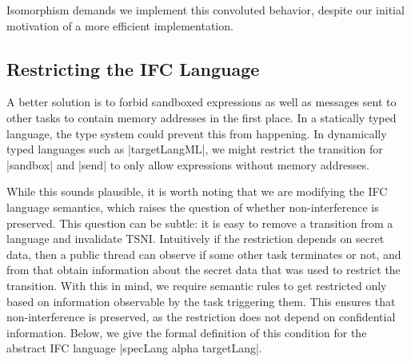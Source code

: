 Isomorphism demands we implement this convoluted behavior,
despite our initial motivation of a more efficient implementation.



\subsection{Restricting the IFC Language}

A better solution is to forbid sandboxed expressions as well
as messages sent to other tasks to contain memory addresses in the
first place.  In a statically typed language, the type system could
prevent this from happening.
In dynamically typed languages such as |targetLangML|, we might
restrict the transition for |sandbox| and |send| to only allow expressions
without memory addresses.

While this sounds plausible, it is worth noting that we are modifying the IFC language semantics,
which raises the question of whether non-interference is preserved.
This question can be subtle: it is easy to remove a transition from
a language and invalidate TSNI.  Intuitively
if the restriction depends on secret data, then a public thread
can observe if some other task terminates or not, and from that obtain
information about the secret data that was used to restrict the
transition.
With this in mind, we require semantic rules to get restricted only
based on information observable by the task triggering them.
This ensures that non-interference is preserved, as the
restriction does not depend on confidential information.
Below, we give the formal definition of this condition for the
abstract IFC language |specLang alpha targetLang|.





